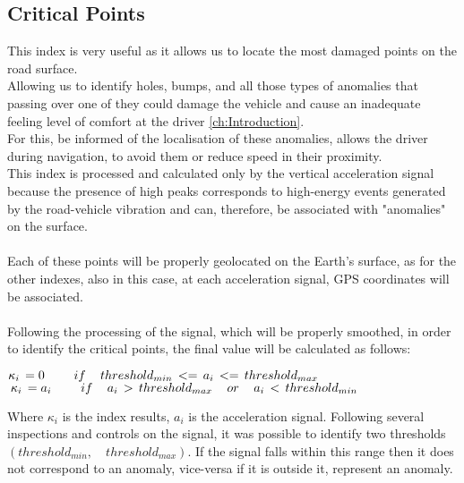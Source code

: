 \documentclass[tesi]{subfiles}
\begin{document}
\subsection{Critical Points}\label{ssc:Critical Points}
This index is very useful as it allows us to locate the most damaged points on the road surface.\\
\noindent Allowing us to identify holes, bumps, and all those types of anomalies that passing over one of they could damage the vehicle and cause an inadequate feeling level of comfort at the driver \ref{ch:Introduction}.\\For this, be informed of the localisation of these anomalies,  allows the driver during navigation, to avoid them or reduce speed in their proximity.\\
\noindent This index is processed and calculated only by the vertical acceleration signal because the presence of high peaks corresponds to high-energy events generated by the road-vehicle vibration and can, therefore, be associated with "anomalies" on the surface.\\\\
\noindent Each of these points will be properly geolocated on the Earth's surface, as for the other indexes, also in this case, at each acceleration signal, GPS coordinates will be associated.	\\\\
\noindent Following the processing of the signal, which will be properly smoothed, in order to identify the critical points, the final value will be calculated as follows: 
\begin{center}
${\large \kappa_{i} \thinspace = 0 \qquad	if \quad	threshold_{min} \thinspace <= \thinspace a_{i} \thinspace <= \thinspace threshold_{max}}$\\

${\large \thinspace \kappa_{i} \thinspace = a_{i} \qquad if \quad a_{i} \thinspace > \thinspace threshold_{max} \quad or \quad a_{i} \thinspace < \thinspace threshold_{min}}$
\end{center}

\noindent Where $\kappa_{i}$ is the index results, $a_{i}$ is the acceleration signal. Following several inspections and controls on the signal, it was possible to identify two thresholds $\left(threshold_{min},\quad threshold_{max}\right)$. 
If the signal falls within this range then it does not correspond to an anomaly, vice-versa if it is outside it, represent an anomaly.\\\\
\end{document}
